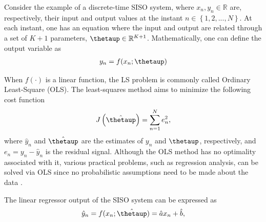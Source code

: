 \documentclass[english]{sobraep}
\begin{document}
Consider the example of a discrete-time SISO system, where $x_n, y_n \in \mathbb{R}$ are, respectively, their input and output values at the instant $n \in \left\{1,2,...,N\right\}$. At each instant, one has an equation where the input and output are related through a set of \(K+1\) parameters, $\boldsymbol{\thetaup} \in \mathbb{R}^{K+1}$. Mathematically, one can define the output variable as
\begin{align}
    y_n = f(x_n;\boldsymbol{\thetaup})
\end{align}

When $f(\cdot)$ is a linear function, the LS problem is commonly called Ordinary Least-Square (OLS). The least-squares method aims to minimize the following cost function
\begin{align}
    J\left( \hat{\boldsymbol{\thetaup}} \right) = \sum_{n=1}^{N} e_n^2,
\end{align}
where \(\hat{y}_n\) and \(\hat{\boldsymbol{\thetaup}}\) are the estimates of \(y_n\) and \(\boldsymbol{\thetaup}\), respectively, and \(e_n = y_n - \hat{y}_n\) is the residual signal. Although the OLS method has no optimality associated with it, various practical problems, such as regression analysis, can be solved via OLS since no probabilistic assumptions need to be made about the data \cite{kay1993fundamentals}.

The linear regressor output of the SISO system can be expressed as
\begin{align}
    \label{eq:y_n}
    \hat{y}_n = f(x_n;\hat{\boldsymbol{\thetaup}}) = \hat{a}x_n + \hat{b},
\end{align}
\end{document}
